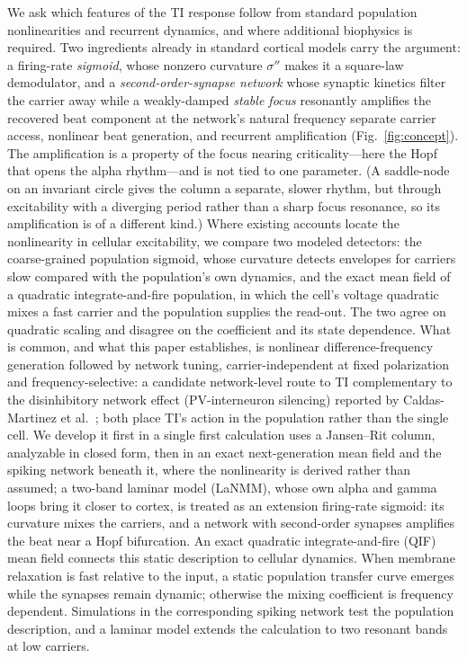 \documentclass[11pt,a4paper]{article}
\newcommand{\Sig}{\sigma}
\providecommand{\DIFaddtex}[1]{{\protect\color{blue} \sf #1}} %
\providecommand{\DIFdeltex}[1]{{\protect\color{red} \scriptsize #1}} %
\providecommand{\DIFaddbegin}{} %
\providecommand{\DIFaddend}{} %
\providecommand{\DIFdelbegin}{} %
\providecommand{\DIFdelend}{} %
\providecommand{\DIFadd}[1]{\texorpdfstring{\DIFaddtex{#1}}{#1}} %
\providecommand{\DIFdel}[1]{\texorpdfstring{\DIFdeltex{#1}}{}} %
\begin{document}
We \DIFdelbegin \DIFdel{ask which features of the TI response follow from standard population
nonlinearities and recurrent dynamics, and where additional biophysics is required. Two
ingredients already in standard cortical models carry the argument: a firing-rate
\emph{sigmoid}, whose nonzero curvature $\Sig''$ makes it a square-law demodulator, and a
\emph{second-order-synapse network} whose synaptic kinetics filter the carrier away
while a weakly-damped \emph{stable focus} resonantly amplifies the recovered beat component at
the network's natural frequency }\DIFdelend \DIFaddbegin \DIFadd{separate carrier access, nonlinear beat generation, and recurrent amplification
}\DIFaddend (Fig.~\ref{fig:concept}). The \DIFdelbegin \DIFdel{amplification is a property
of the focus nearing criticality---here the Hopf that opens the alpha rhythm---and is not
tied to one parameter. (A saddle-node on an invariant circle gives
the column a separate, slower rhythm, but through excitability with a diverging period rather
than a sharp focus resonance, so its amplification is of a different kind.)
Where existing accounts locate the nonlinearity in cellular excitability, we compare two
modeled detectors: the coarse-grained population sigmoid, whose curvature detects envelopes
for carriers slow compared with the population's own dynamics, and the exact mean field of
a quadratic integrate-and-fire population, in which the cell's voltage quadratic mixes a fast carrier and the population supplies the read-out. The two agree on quadratic scaling
and disagree on the coefficient and its state dependence. What is common, and what this
paper establishes, is nonlinear difference-frequency generation followed by network tuning,
carrier-independent at fixed polarization and frequency-selective: a candidate
network-level route to TI complementary to the
disinhibitory network effect (PV-interneuron
silencing) reported by Caldas-Martinez et al.\ \cite{caldas2024}; both place TI's action in
the population rather than the single cell.
We develop it first in a single }\DIFdelend \DIFaddbegin \DIFadd{first calculation uses a }\DIFaddend Jansen--Rit \DIFdelbegin \DIFdel{column, analyzable in closed form, then in an exact next-generation mean field and the spiking network beneath it, where the nonlinearity is derived rather than assumed; a two-band laminar model (LaNMM), whose own alpha and gamma loops bring it closer to cortex,
is treated as an extension }\DIFdelend \DIFaddbegin \DIFadd{firing-rate sigmoid:
its curvature mixes the carriers, and a network with second-order synapses amplifies
the beat near a Hopf bifurcation. An exact quadratic integrate-and-fire (QIF) mean
field connects this static description to cellular dynamics. When membrane relaxation
is fast relative to the input, a static population transfer curve emerges while the
synapses remain dynamic; otherwise the mixing coefficient is frequency dependent.
Simulations in the corresponding spiking network test the population description,
and a laminar model extends the calculation to two resonant bands }\DIFaddend at low carriers.
\end{document}

